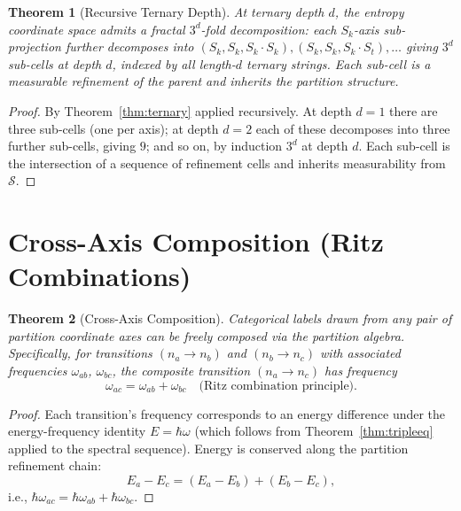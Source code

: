 \documentclass[twocolumn,11pt,a4paper]{article}
\theoremstyle{thmstyle}
\newtheorem{theorem}{Theorem}[section]
\theoremstyle{axiomstyle}
\theoremstyle{definition}
\theoremstyle{remark}
\newcommand{\Sk}{S_{k}}
\newcommand{\St}{S_{t}}
\newcommand{\Sspace}{\mathcal{S}}
\begin{document}
\begin{theorem}[Recursive Ternary Depth]\label{thm:recursivedepth}
At ternary depth $d$, the entropy coordinate space admits a fractal $3^{d}$-fold decomposition: each $\Sk$-axis sub-projection further decomposes into $(\Sk,\Sk,\Sk\cdot\Sk),(\Sk,\Sk,\Sk\cdot\St),\ldots$ giving $3^{d}$ sub-cells at depth $d$, indexed by all length-$d$ ternary strings. Each sub-cell is a measurable refinement of the parent and inherits the partition structure.
\end{theorem}

\begin{proof}
By Theorem~\ref{thm:ternary} applied recursively. At depth $d=1$ there are three sub-cells (one per axis); at depth $d=2$ each of these decomposes into three further sub-cells, giving $9$; and so on, by induction $3^{d}$ at depth $d$. Each sub-cell is the intersection of a sequence of refinement cells and inherits measurability from $\Sspace$.
\end{proof}

\section{Cross-Axis Composition (Ritz Combinations)}
\label{sec:crossaxis}

\begin{theorem}[Cross-Axis Composition]\label{thm:crossaxis}
Categorical labels drawn from any pair of partition coordinate axes can be freely composed via the partition algebra. Specifically, for transitions $(n_{a}\to n_{b})$ and $(n_{b}\to n_{c})$ with associated frequencies $\omega_{ab}$, $\omega_{bc}$, the composite transition $(n_{a}\to n_{c})$ has frequency
\begin{equation}
\omega_{ac}=\omega_{ab}+\omega_{bc}\quad\text{(Ritz combination principle)}.
\end{equation}
\end{theorem}

\begin{proof}
Each transition's frequency corresponds to an energy difference under the energy-frequency identity $E=\hbar\omega$ (which follows from Theorem~\ref{thm:tripleeq} applied to the spectral sequence). Energy is conserved along the partition refinement chain:
\begin{equation}
E_{a}-E_{c}=(E_{a}-E_{b})+(E_{b}-E_{c}),
\end{equation}
i.e., $\hbar\omega_{ac}=\hbar\omega_{ab}+\hbar\omega_{bc}$.
\end{proof}
\end{document}
